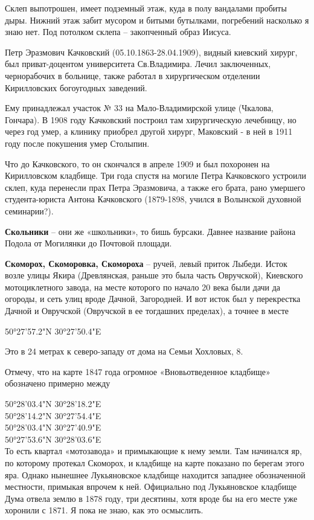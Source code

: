 Склеп выпотрошен, имеет подземный этаж, куда в полу вандалами пробиты дыры. Нижний этаж забит мусором и битыми бутылками, погребений насколько я знаю нет. Под потолком склепа – закопченный образ Иисуса.

Петр Эразмович Качковский (05.10.1863-28.04.1909), видный киевский хирург, был приват-доцентом университета Св.Владимира. Лечил заключенных, чернорабочих в больнице, также работал в хирургическом отделении Кирилловских богоугодных заведений.

Ему принадлежал участок № 33 на Мало-Владимирской улице (Чкалова, Гончара). В 1908 году Качковский построил там  хирургическую лечебницу, но через год умер, а клинику приобрел другой хирург, Маковский - в ней в 1911 году после покушения умер Столыпин.

Что до Качковского, то он скончался в апреле 1909 и был похоронен на Кирилловском кладбище. Три года спустя на могиле Петра Качковского устроили склеп, куда перенесли прах Петра Эразмовича, а также его брата, рано умершего студента-юриста Антона Качковского (1879-1898, учился в Волынской духовной семинарии?).\\

\medskip


\textbf{Скольники} – они же «школьники», то бишь бурсаки. Давнее название района Подола от Могилянки до Почтовой площади.\\

\medskip


\textbf{Скоморох, Скоморовка, Скомороха} – ручей, левый приток Лыбеди. Исток возле улицы Якира (Древлянская, раньше это была часть Овручской), Киевского мотоциклетного завода, на месте которого по начало 20 века были дачи да огороды, и сеть улиц вроде Дачной, Загородней. И вот исток был у перекрестка Дачной и Овручской (Овручской в ее тогдашних пределах), а точнее в месте 

50°27'57.2"N 30°27'50.4"E

Это в 24 метрах к северо-западу от дома на Семьи Хохловых, 8.

Отмечу, что на карте 1847 года огромное «Вновьотведенное кладбище» обозначено примерно между 

50°28'03.4"N 30°28'18.2"E\\
50°28'14.2"N 30°27'54.4"E\\
50°28'03.4"N 30°27'40.9"E\\
50°27'53.6"N 30°28'03.6"E\\

То есть квартал «мотозавода» и примыкающие к нему земли. Там начинался яр, по которому протекал Скоморох, и кладбище на карте показано по берегам этого яра. Однако нынешнее Лукьяновское кладбище находится западнее обозначенной местности, примыкая впрочем к ней. Официально под Лукьяновское кладбище Дума отвела землю в 1878 году, три десятины, хотя вроде бы на его месте уже хоронили с 1871. Я пока не знаю, как это осмыслить.


